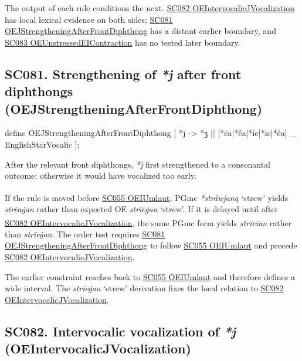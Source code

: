 \documentclass[
  british,
  a4paper,
  openany]{book}
\providecommand{\Pred}[1]{\textsuperscript{\dag}\emph{#1}}
\providecommand{\Recon}[1]{\emph{*#1}}
{\catcode`→=\active \global\def→{\ensuremath{\rightarrow}}}
\providecommand{\texorpdfstring}[2]{#1}
\DeclareRobustCommand{\CAPRRuleHeading}[2]{%
  #1\texorpdfstring{\\(#2)}{ (#2)}%
}
\providecommand{\Pred}[1]{\textsuperscript{\dag}\emph{#1}}
\providecommand{\Recon}[1]{\emph{*#1}}
{\catcode`→=\active \global\def→{\ensuremath{\rightarrow}}}
\begin{document}
The output of each rule conditions the next.
\hyperref[rule-OEIntervocalicJVocalization]{SC082
OEIntervocalicJVocalization} has local lexical evidence on both sides;
\hyperref[rule-OEJStrengtheningAfterFrontDiphthong]{SC081
OEJStrengtheningAfterFrontDiphthong} has a distant earlier boundary, and
\hyperref[rule-OEUnstressedEIContraction]{SC083
OEUnstressedEIContraction} has no tested later boundary.

\subsection{\texorpdfstring{\CAPRRuleHeading{SC081. Strengthening of \emph{*j} after front diphthongs}{OEJStrengtheningAfterFrontDiphthong}}{}}\label{rule-OEJStrengtheningAfterFrontDiphthong}

\begin{ReaderFacingFoma}
define OEJStrengtheningAfterFrontDiphthong [
    {*j} -> {*ʒ} || [{*ēa}|{*ḗa}|{*íe}|{*īe}|{*éa}] _ EnglishStarVocalic
];
\end{ReaderFacingFoma}

After the relevant front diphthongs, \emph{*j} first strengthened to a
consonantal outcome; otherwise it would have vocalized too early.

If the rule is moved before \hyperref[rule-OEIUmlaut]{SC055 OEIUmlaut},
PGmc \Recon{stráwjaną} `strew' yields \Pred{strēaġan} rather than
expected OE \emph{strīeġan} `strew'. If it is delayed until after
\hyperref[rule-OEIntervocalicJVocalization]{SC082
OEIntervocalicJVocalization}, the same PGmc form yields \Pred{strīeian}
rather than \emph{strīeġan}. The order test requires
\hyperref[rule-OEJStrengtheningAfterFrontDiphthong]{SC081
OEJStrengtheningAfterFrontDiphthong} to follow
\hyperref[rule-OEIUmlaut]{SC055 OEIUmlaut} and precede
\hyperref[rule-OEIntervocalicJVocalization]{SC082
OEIntervocalicJVocalization}.

The earlier constraint reaches back to \hyperref[rule-OEIUmlaut]{SC055
OEIUmlaut} and therefore defines a wide interval. The \emph{strīeġan}
`strew' derivation fixes the local relation to
\hyperref[rule-OEIntervocalicJVocalization]{SC082
OEIntervocalicJVocalization}.

\subsection{\texorpdfstring{\CAPRRuleHeading{SC082. Intervocalic vocalization of \emph{*j}}{OEIntervocalicJVocalization}}{}}\label{rule-OEIntervocalicJVocalization}
\end{document}
